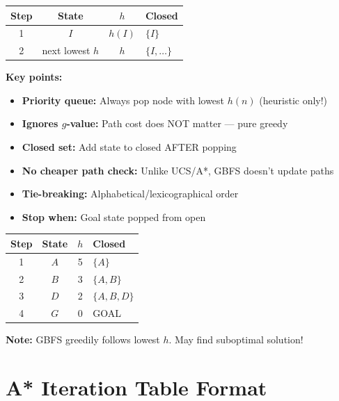 \documentclass[11pt,a4paper]{article}
\begin{document}
\begin{definitionbox}
\begin{center}
\begin{tabular}{|c|c|c|l|}
\hline
\textbf{Step} & \textbf{State} & $h$ & \textbf{Closed} \\
\hline
1 & $I$ & $h(I)$ & $\{I\}$ \\
2 & next lowest $h$ & $h$ & $\{I, \ldots\}$ \\
\hline
\end{tabular}
\end{center}

\textbf{Key points:}
\begin{itemize}[leftmargin=*,nosep]
\item \textbf{Priority queue:} Always pop node with lowest $h(n)$ (heuristic only!)
\item \textbf{Ignores $g$-value:} Path cost does NOT matter --- pure greedy
\item \textbf{Closed set:} Add state to closed AFTER popping
\item \textbf{No cheaper path check:} Unlike UCS/A*, GBFS doesn't update paths
\item \textbf{Tie-breaking:} Alphabetical/lexicographical order
\item \textbf{Stop when:} Goal state popped from open
\end{itemize}
\end{definitionbox}

\begin{examplebox}
\begin{center}
\begin{tabular}{|c|c|c|l|}
\hline
\textbf{Step} & \textbf{State} & $h$ & \textbf{Closed} \\
\hline
1 & $A$ & 5 & $\{A\}$ \\
2 & $B$ & 3 & $\{A, B\}$ \\
3 & $D$ & 2 & $\{A, B, D\}$ \\
4 & $G$ & 0 & GOAL \\
\hline
\end{tabular}
\end{center}
\textbf{Note:} GBFS greedily follows lowest $h$. May find suboptimal solution!
\end{examplebox}

\section{A* Iteration Table Format}
\end{document}
